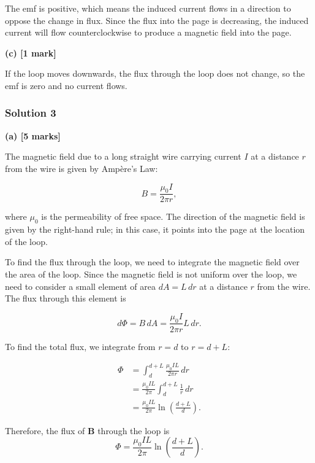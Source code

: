 \documentclass{article}
\begin{document}
The emf is positive, which means the induced current flows in a direction to oppose the change in flux.  Since the flux into the page is decreasing, the induced current will flow counterclockwise to produce a magnetic field into the page.

\textbf{(c) [1 mark]}

If the loop moves downwards, the flux through the loop does not change, so the emf is zero and no current flows.

\subsubsection{Solution 3}
\textbf{(a) [5 marks]}

The magnetic field due to a long straight wire carrying current $I$ at a distance $r$ from the wire is given by Ampère's Law:

\begin{equation*}
B = \frac{\mu_0 I}{2 \pi r},
\end{equation*}

where $\mu_0$ is the permeability of free space. The direction of the magnetic field is given by the right-hand rule; in this case, it points into the page at the location of the loop.

To find the flux through the loop, we need to integrate the magnetic field over the area of the loop. Since the magnetic field is not uniform over the loop, we need to consider a small element of area $dA = L \, dr$ at a distance $r$ from the wire. The flux through this element is

\begin{equation*}
d\Phi = B \, dA = \frac{\mu_0 I}{2 \pi r} L \, dr.
\end{equation*}

To find the total flux, we integrate from $r = d$ to $r = d + L$:

\begin{align*}
\Phi &= \int_{d}^{d+L} \frac{\mu_0 I L}{2 \pi r} \, dr \\
&= \frac{\mu_0 I L}{2 \pi} \int_{d}^{d+L} \frac{1}{r} \, dr \\
&= \frac{\mu_0 I L}{2 \pi} \ln \left( \frac{d+L}{d} \right).
\end{align*}

Therefore, the flux of $\mathbf{B}$ through the loop is 
\begin{equation*}
\boxed{\Phi = \frac{\mu_0 I L}{2 \pi} \ln \left( \frac{d+L}{d} \right)}.
\end{equation*}
\end{document}
